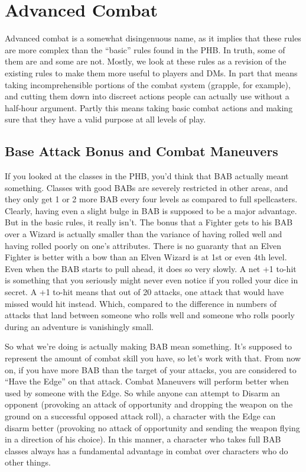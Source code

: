 
\section{Advanced Combat}

Advanced combat is a somewhat disingenuous name, as it implies that these rules are more complex than the ``basic'' rules found in the PHB. In truth, some of them are and some are not. Mostly, we look at these rules as a revision of the existing rules to make them more useful to players and DMs. In part that means taking incomprehensible portions of the combat system (grapple, for example), and cutting them down into discreet actions people can actually use without a half-hour argument. Partly this means taking basic combat actions and making sure that they have a valid purpose at all levels of play.

\subsection{Base Attack Bonus and Combat Maneuvers}

If you looked at the classes in the PHB, you'd think that BAB actually meant something. Classes with good BABs are severely restricted in other areas, and they only get 1 or 2 more BAB every four levels as compared to full spellcasters. Clearly, having even a slight bulge in BAB is supposed to be a major advantage. But in the basic rules, it really isn't. The bonus that a Fighter gets to his BAB over a Wizard is actually smaller than the variance of having rolled well and having rolled poorly on one's attributes. There is no guaranty that an Elven Fighter is better with a bow than an Elven Wizard is at 1st or even 4th level. Even when the BAB starts to pull ahead, it does so very slowly. A net +1 to-hit is something that you seriously might never even notice if you rolled your dice in secret. A +1 to-hit means that out of 20 attacks, one attack that would have missed would hit instead. Which, compared to the difference in numbers of attacks that land between someone who rolls well and someone who rolls poorly during an adventure is vanishingly small.

So what we're doing is actually making BAB mean something. It's supposed to represent the amount of combat skill you have, so let's work with that. From now on, if you have more BAB than the target of your attacks, you are considered to ``Have the Edge'' on that attack. Combat Maneuvers will perform better when used by someone with the Edge. So while anyone can attempt to Disarm an opponent (provoking an attack of opportunity and dropping the weapon on the ground on a successful opposed attack roll), a character with the Edge can disarm better (provoking no attack of opportunity and sending the weapon flying in a direction of his choice). In this manner, a character who takes full BAB classes always has a fundamental advantage in combat over characters who do other things.

